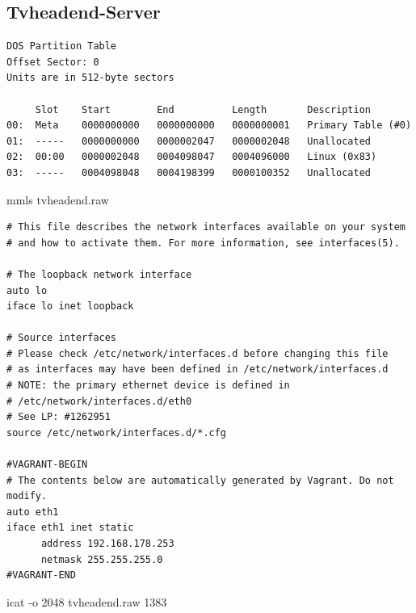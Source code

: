 \subsection{Tvheadend-Server}

\begin{cmd}[H]
\begin{verbatim}
DOS Partition Table
Offset Sector: 0
Units are in 512-byte sectors

     Slot    Start        End          Length       Description
00:  Meta    0000000000   0000000000   0000000001   Primary Table (#0)
01:  -----   0000000000   0000002047   0000002048   Unallocated
02:  00:00   0000002048   0004098047   0004096000   Linux (0x83)
03:  -----   0004098048   0004198399   0000100352   Unallocated
\end{verbatim}
\caption{mmls tvheadend.raw}
\label{cmd:tvheadend-mmls}
\end{cmd}

\begin{cmd}[H]
\begin{verbatim}
# This file describes the network interfaces available on your system
# and how to activate them. For more information, see interfaces(5).

# The loopback network interface
auto lo
iface lo inet loopback

# Source interfaces
# Please check /etc/network/interfaces.d before changing this file
# as interfaces may have been defined in /etc/network/interfaces.d
# NOTE: the primary ethernet device is defined in
# /etc/network/interfaces.d/eth0
# See LP: #1262951
source /etc/network/interfaces.d/*.cfg

#VAGRANT-BEGIN
# The contents below are automatically generated by Vagrant. Do not modify.
auto eth1
iface eth1 inet static
      address 192.168.178.253
      netmask 255.255.255.0
#VAGRANT-END
\end{verbatim}
\caption{icat -o 2048 tvheadend.raw 1383}
\label{cmd:tvheadend-interfaces}
\end{cmd}

